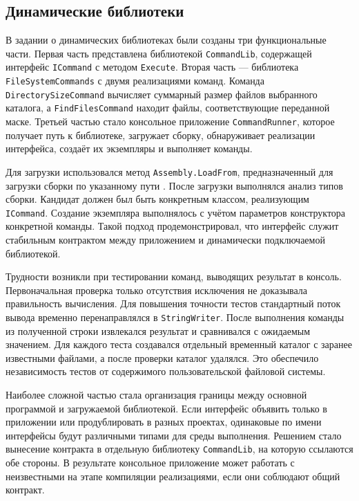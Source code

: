 \subsection{Динамические библиотеки}

В задании о динамических библиотеках были созданы три функциональные части. Первая часть представлена библиотекой \texttt{CommandLib}, содержащей интерфейс \texttt{ICommand} с методом \texttt{Execute}. Вторая часть --- библиотека \texttt{FileSystemCommands} с двумя реализациями команд. Команда \texttt{DirectorySizeCommand} вычисляет суммарный размер файлов выбранного каталога, а \texttt{FindFilesCommand} находит файлы, соответствующие переданной маске. Третьей частью стало консольное приложение \texttt{CommandRunner}, которое получает путь к библиотеке, загружает сборку, обнаруживает реализации интерфейса, создаёт их экземпляры и выполняет команды.

Для загрузки использовался метод \texttt{Assembly.LoadFrom}, предназначенный для загрузки сборки по указанному пути \cite{loadfrom}. После загрузки выполнялся анализ типов сборки. Кандидат должен был быть конкретным классом, реализующим \texttt{ICommand}. Создание экземпляра выполнялось с учётом параметров конструктора конкретной команды. Такой подход продемонстрировал, что интерфейс служит стабильным контрактом между приложением и динамически подключаемой библиотекой.

Трудности возникли при тестировании команд, выводящих результат в консоль. Первоначальная проверка только отсутствия исключения не доказывала правильность вычисления. Для повышения точности тестов стандартный поток вывода временно перенаправлялся в \texttt{StringWriter}. После выполнения команды из полученной строки извлекался результат и сравнивался с ожидаемым значением. Для каждого теста создавался отдельный временный каталог с заранее известными файлами, а после проверки каталог удалялся. Это обеспечило независимость тестов от содержимого пользовательской файловой системы.

Наиболее сложной частью стала организация границы между основной программой и загружаемой библиотекой. Если интерфейс объявить только в приложении или продублировать в разных проектах, одинаковые по имени интерфейсы будут различными типами для среды выполнения. Решением стало вынесение контракта в отдельную библиотеку \texttt{CommandLib}, на которую ссылаются обе стороны. В результате консольное приложение может работать с неизвестными на этапе компиляции реализациями, если они соблюдают общий контракт.

